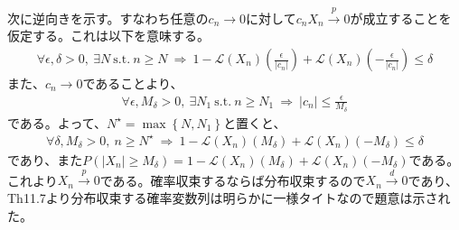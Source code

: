 \documentclass{article}
\begin{document}
\noindent
次に逆向きを示す。すなわち任意の$c_n \to 0$に対して$c_n X_n \xrightarrow{p} 0$が成立することを仮定する。これは以下を意味する。
\begin{align*}
	\forall \epsilon , \delta > 0,\ \exists N\ \text{s.t.}\ n\geq N\ \Rightarrow\ 1-\mathcal{L}(X_n)\left( \frac{\epsilon}{\left| c_n \right|} \right) + \mathcal{L}(X_n)\left( -\frac{\epsilon}{\left| c_n \right|} \right) \leq \delta
\end{align*}
また、$c_n\to 0$であることより、
\begin{align*}
	\forall \epsilon , M_{\delta} > 0, \ \exists N_1\ \text{s.t.}\ n\geq N_1\ \Rightarrow\ \left| c_n \right| \leq \frac{\epsilon}{M_{\delta}}
\end{align*}
である。よって、$N^{\star} = \max\left\{ N, N_1 \right\}$と置くと、
\begin{align*}
	\forall \delta, M_{\delta} > 0, \  n\geq N^{\star} \ \Rightarrow\ 1-\mathcal{L}(X_n)\left( M_{\delta} \right) + \mathcal{L}(X_n)\left(- M_{\delta} \right) \leq \delta
\end{align*}
であり、また$P\left( \left| X_n \right| \geq M_{\delta} \right) = 1-\mathcal{L}(X_n)\left( M_{\delta} \right) + \mathcal{L}(X_n)\left(- M_{\delta} \right)$である。これより$X_n\xrightarrow{p}0$である。確率収束するならば分布収束するので$X_n\xrightarrow{d}0$であり、Th11.7より分布収束する確率変数列は明らかに一様タイトなので題意は示された。
\end{document}
